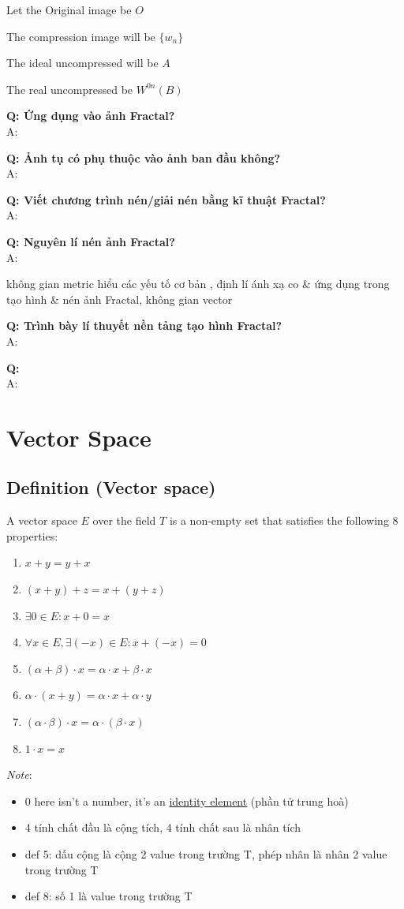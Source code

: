 Let the Original image be $O$

The compression image will be $\{ w_n \}$

The ideal uncompressed will be $A$

The real uncompressed be $W^{0n}(B)$

\textbf{Q: Ứng dụng vào ảnh Fractal?}\\
A: 

\textbf{Q: Ảnh tụ có phụ thuộc vào ảnh ban đầu không?}\\
A:

\textbf{Q: Viết chương trình nén/giải nén bằng kĩ thuật Fractal?}\\
A: 

\textbf{Q: Nguyên lí nén ảnh Fractal?}\\
A: 


không gian metric hiểu các yếu tố cơ bản
, định lí ánh xạ co \& ứng dụng trong tạo hình \& nén ảnh Fractal, 
không gian vector

\textbf{Q: Trình bày lí thuyết nền tảng tạo hình Fractal?}\\
A: 


\textbf{Q: }\\
A: 

\newpage
\section{Vector Space}
\subsection{Definition (Vector space)}

A vector space $E$ over the field $T$ is a non-empty set that satisfies the following 8 properties:

\begin{enumerate}
    \item $x + y = y + x$
    \item $(x + y) + z = x + (y + z)$
    \item $\exists 0 \in E: x + 0 = x$
    \item $\forall x \in E, \exists (-x) \in E: x + (-x) = 0$
    \item $(\alpha + \beta) \cdot x = \alpha \cdot x + \beta \cdot x$
    \item $\alpha \cdot (x + y) = \alpha \cdot x + \alpha \cdot y$
    \item $(\alpha \cdot \beta) \cdot x = \alpha \cdot (\beta \cdot x)$
    \item $1 \cdot x = x$
\end{enumerate}
\textit{Note}: 
\begin{itemize}
    \item 0 here isn't a number, it's an \href{https://en.wikipedia.org/wiki/Identity_element}{identity element} (phần tử trung hoà)
    \item 4 tính chất đầu là cộng tích, 4 tính chất sau là nhân tích
    \item def 5: dấu cộng là cộng 2 value trong trường T, phép nhân là nhân 2 value trong trường T
    \item def 8: số 1 là value trong trường T
\end{itemize}

